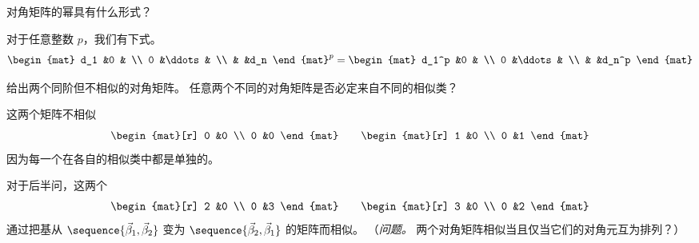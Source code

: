   \recommended \item \label{exer:PowersOfDiags}
    对角矩阵的幂具有什么形式？
    \begin{answer}
      对于任意整数 \( p \)，我们有下式。
      \begin{equation*}
        \begin{mat}
          d_1  &0      &   \\
          0    &\ddots &   \\
               &       &d_n
        \end{mat}^p=
        \begin{mat}
          d_1^p  &0      &   \\
          0      &\ddots &   \\
                 &       &d_n^p
        \end{mat}
     \end{equation*} 
    \end{answer}
  \item 
     给出两个同阶但不相似的对角矩阵。
     任意两个不同的对角矩阵是否必定来自不同的相似类？
     \begin{answer}
       这两个矩阵不相似 
       \begin{equation*}
          \begin{mat}[r]
             0  &0  \\
             0  &0
          \end{mat}
          \qquad
          \begin{mat}[r]
             1  &0  \\
             0  &1
          \end{mat}
       \end{equation*}
       因为每一个在各自的相似类中都是单独的。

       对于后半问，这两个
       \begin{equation*}
          \begin{mat}[r]
             2  &0  \\
             0  &3
          \end{mat}
          \qquad
          \begin{mat}[r]
             3  &0  \\
             0  &2
          \end{mat}
       \end{equation*}
       通过把基从
       \( \sequence{\vec{\beta}_1,\vec{\beta}_2} \) 变为
       \( \sequence{\vec{\beta}_2,\vec{\beta}_1} \) 的矩阵而相似。
       （\textit{问题。}
        两个对角矩阵相似当且仅当它们的对角元互为排列？）  
    \end{answer}
